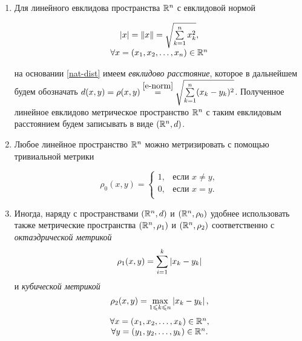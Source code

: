 \documentclass[../../main.tex]{subfiles}
\begin{document}
\begin{rems} 

 \quad

 \begin{enumerate}
  \item  Для линейного евклидова пространства $\mathbb{R}^n$ с евклидовой
  нормой
  
  \begin{equation}
   \label{e-norm}
   \begin{array}{c}
    \left|{x}\right| = \lVert{x}\rVert = \sqrt{\sum\limits_{k=1}^n x_k^2}, \\
    \forall x = (x_1, x_2, \dots, x_n) \in \mathbb{R}^n
   \end{array}
  \end{equation}
  
  на основании \eqref{nat-dist} имеем \emph{евклидово 
  расстояние}, которое
  в дальнейшем будем обозначать $d(x, y) = \rho(x, y) \stk{e-norm}{=}
  \sqrt{\sum\limits_{k=1}^n (x_k - y_k)^2}$. Полученное линейное евклидово 
  метрическое пространство $\mathbb{R}^n$ с таким евклидовым расстоянием 
  будем записывать в виде $(\mathbb{R}^n, d)$.
  
  \item Любое линейное пространство $\mathbb{R}^n$ можно метризировать с
  помощью тривиальной метрики
  
  \[
   \rho_0(x, y) =
   \begin{cases}
    1, & \text{если } x \ne y, \\
    0, & \text{если } x = y. \\
   \end{cases}
  \]
  
  \item Иногда, наряду с пространствами $(\mathbb{R}^n, d)$ и $(\mathbb{R}^n, \rho_0)$
  удобнее использовать также метрические пространства $(\mathbb{R}^n, \rho_1)$
  и $(\mathbb{R}^n, \rho_2)$ соответственно с \emph{октаэдрической метрикой}
  \[\rho_1(x, y) = \sum_{i=1}^k \left|{x_k - y_k}\right|\]
  и \emph{кубической метрикой}
  \[\rho_2(x, y) = \max_{1 \leqslant k \leqslant n} \left|{x_k - y_k}\right|,\]
  \[\begin{array}{c}
     \forall x = (x_1, x_2, \dots, x_k) \in \mathbb{R}^n, \\
     \forall y = (y_1, y_2, \dots, y_k) \in \mathbb{R}^n. \\
    \end{array}\]
 \end{enumerate}

\end{rems}
\end{document}
